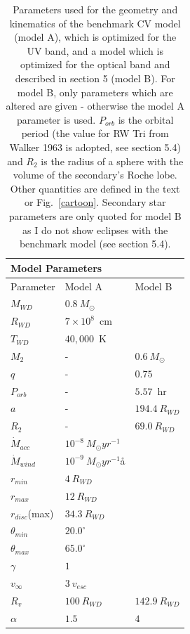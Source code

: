 \begin{table}
\centering
\begin{tabular}{p{2cm}p{2cm}p{2cm}}
\multicolumn{2}{|l|}{Model Parameters}  \\
\hline Parameter 	&	 Model A  & Model B \\ 
\hline \hline 
$M_{WD}$ 	 &	 $0.8~M_{\odot}$  &     \\ 
$R_{WD}$ 	 &	 $7\times10^{8}$~cm  & \\ 
$T_{WD}$ 	 &	 $40,000$~K        &  \\
$M_{2}$ 	& -&	 $0.6~M_{\odot}$   \\ 
$q$ 	&- &	 $0.75$   \\ 
$P_{orb}$ 	&- &	 $5.57$~hr   \\ 
$a$ 	& -&	 $194.4~R_{WD}$   \\ 
$R_2$   &   -  &	 $69.0~R_{WD}$  \\ 
$\dot{M}_{acc}$ 	 &	 $10^{-8}~M_{\odot}yr^{-1}$  &\\ 
$\dot{M}_{wind}$  &	$10^{-9}~M_{\odot}yr^{-1}$å  & \\ 
$r_{min}$ 	&	 $4~R_{WD}$ &  \\ 
$r_{max}$ 	&	 $12~R_{WD}$  &  \\ 
$r_{disc}$(max) 	&	 $34.3~R_{WD}$  &  \\ 
$\theta_{min}$ 	&	 $20.0^{\circ}$  &  \\ 
$\theta_{max}$ 	&	 $65.0^{\circ}$  &  \\ 
$\gamma$ 	&	 $1$  &  \\ 
$v_{\infty}$ 	&	 $3~v_{esc}$  &  \\ 
$R_v$ 	        &	 $100~R_{WD}$  &  $142.9~R_{WD}$  \\ 
$\alpha$ 	&	 $1.5$   &   $4$\\
\end{tabular}
\centering
\caption{
Parameters used for the geometry and kinematics of the benchmark 
CV model (model A), which is optimized for the UV band, and a model
which is optimized for the optical band and described in section 5 (model B).
For model B, only parameters which are altered are given - otherwise the
model A parameter is used. $P_{orb}$ is the orbital period 
(the value for RW Tri from Walker 1963 is adopted, see section 5.4) and 
$R_2$ is the radius of a sphere with the volume of the secondary's Roche lobe. 
Other quantities are defined in the text or Fig.~\ref{cartoon}.
Secondary star parameters are only quoted for 
model B as I do not show eclipses with the 
benchmark model (see section 5.4).
}
\label{wind_param}
\label{modelb_table}
\end{table}

